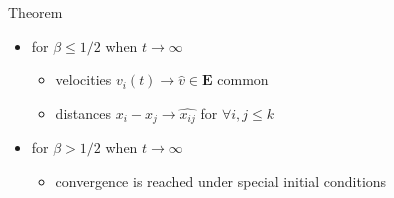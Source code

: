 \documentclass{beamer}
\begin{document}
\begin{frame}{Theorem}
	\begin{itemize}
		\item for $\beta \le 1/2$ when $t\rightarrow\infty$
		\begin{itemize}
			\item velocities $v_i(t)\rightarrow\widehat{v}\in\mathbf{E}$ common
			\item distances $x_i-x_j\rightarrow\widehat{x_{ij}}$ for $\forall i,j\leq k$
		\end{itemize}
		\vspace{0.5cm}
		\item for $\beta > 1/2$ when $t\rightarrow\infty$
		\begin{itemize}
			\item convergence is reached under special initial conditions
		\end{itemize}
	\end{itemize}
\end{frame}
\end{document}
